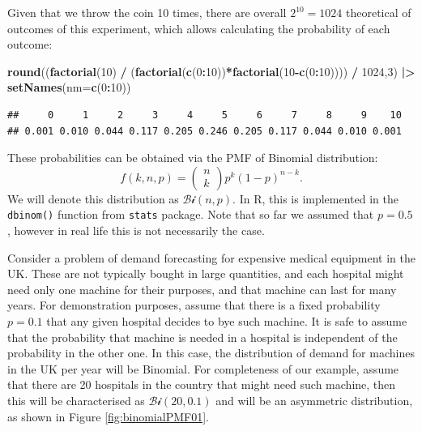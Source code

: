 \documentclass[
]{book}
\newenvironment{Shaded}{\begin{snugshade}}{\end{snugshade}}
\newcommand{\DataTypeTok}[1]{\textcolor[rgb]{0.13,0.29,0.53}{#1}}
\newcommand{\DecValTok}[1]{\textcolor[rgb]{0.00,0.00,0.81}{#1}}
\newcommand{\ErrorTok}[1]{\textcolor[rgb]{0.64,0.00,0.00}{\textbf{#1}}}
\newcommand{\KeywordTok}[1]{\textcolor[rgb]{0.13,0.29,0.53}{\textbf{#1}}}
\newcommand{\NormalTok}[1]{#1}
\newcommand{\OperatorTok}[1]{\textcolor[rgb]{0.81,0.36,0.00}{\textbf{#1}}}
\newcommand{\StringTok}[1]{\textcolor[rgb]{0.31,0.60,0.02}{#1}}
\theoremstyle{definition}
\theoremstyle{definition}
\theoremstyle{definition}
\theoremstyle{definition}
\theoremstyle{remark}
\begin{document}
Given that we throw the coin 10 times, there are overall \(2^{10}=1024\) theoretical of outcomes of this experiment, which allows calculating the probability of each outcome:

\begin{Shaded}
\begin{Highlighting}[]
\KeywordTok{round}\NormalTok{((}\KeywordTok{factorial}\NormalTok{(}\DecValTok{10}\NormalTok{) }\OperatorTok{/}
\StringTok{           }\NormalTok{(}\KeywordTok{factorial}\NormalTok{(}\KeywordTok{c}\NormalTok{(}\DecValTok{0}\OperatorTok{:}\DecValTok{10}\NormalTok{))}\OperatorTok{*}\KeywordTok{factorial}\NormalTok{(}\DecValTok{10}\OperatorTok{{-}}\KeywordTok{c}\NormalTok{(}\DecValTok{0}\OperatorTok{:}\DecValTok{10}\NormalTok{)))) }\OperatorTok{/}
\StringTok{          }\DecValTok{1024}\NormalTok{,}\DecValTok{3}\NormalTok{) }\OperatorTok{|}\ErrorTok{\textgreater{}}
\StringTok{    }\KeywordTok{setNames}\NormalTok{(}\DataTypeTok{nm=}\KeywordTok{c}\NormalTok{(}\DecValTok{0}\OperatorTok{:}\DecValTok{10}\NormalTok{))}
\end{Highlighting}
\end{Shaded}

\begin{verbatim}
##     0     1     2     3     4     5     6     7     8     9    10 
## 0.001 0.010 0.044 0.117 0.205 0.246 0.205 0.117 0.044 0.010 0.001
\end{verbatim}

These probabilities can be obtained via the PMF of Binomial distribution:
\begin{equation}
    f(k, n, p) = \begin{pmatrix} n \\ k \end{pmatrix} p^k (1-p)^{n-k} .
    \label{eq:BinomialPMF}
\end{equation}
We will denote this distribution as \(\mathcal{Bi}(n, p)\). In R, this is implemented in the \texttt{dbinom()} function from \texttt{stats} package. Note that so far we assumed that \(p=0.5\), however in real life this is not necessarily the case.

Consider a problem of demand forecasting for expensive medical equipment in the UK. These are not typically bought in large quantities, and each hospital might need only one machine for their purposes, and that machine can last for many years. For demonstration purposes, assume that there is a fixed probability \(p=0.1\) that any given hospital decides to bye such machine. It is safe to assume that the probability that machine is needed in a hospital is independent of the probability in the other one. In this case, the distribution of demand for machines in the UK per year will be Binomial. For completeness of our example, assume that there are 20 hospitals in the country that might need such machine, then this will be characterised as \(\mathcal{Bi}(20, 0.1)\) and will be an asymmetric distribution, as shown in Figure \ref{fig:binomialPMF01}.
\end{document}

